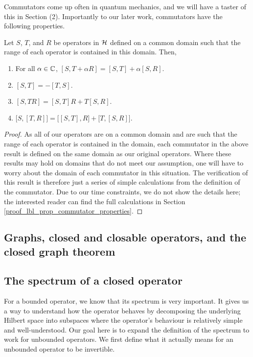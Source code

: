 Commutators come up often in quantum mechanics, and we will have a taster of this in Section (2). Importantly to our later work, commutators have the following properties.

\begin{proposition}\label{lbl_prop_commutator_properties}
  Let $S$, $T$, and $R$ be operators in $\mathcal{H}$ defined on a common domain such that the range of each operator is contained in this domain. Then,
  \begin{enumerate}[label = (\alph*)]
    \item For all $\alpha \in \mathbb{C}$, $[S, T + \alpha R] = [S, T] + \alpha [S, R]$.
    \item $[S, T] = - [T, S]$.
    \item $[S, TR] = [S, T]R + T[S, R]$.
    \item $\big[ S, [T, R] \big] = \big[ [S, T], R \big] + \big[T, [S, R] \big]$.
  \end{enumerate}
\end{proposition}
\begin{proof}
  As all of our operators are on a common domain and are such that the range of each operator is contained in the domain, each commutator in the above result is defined on the same domain as our original operators. Where these results may hold on domains that do not meet our assumption, one will have to worry about the domain of each commutator in this situation. The verification of this result is therefore just a series of simple calculations from the definition of the commutator. Due to our time constraints, we do not show the details here; the interested reader can find the full calculations in Section \eqref{proof_lbl_prop_commutator_properties}.
\end{proof}

\subsection{Graphs, closed and closable operators, and the closed graph theorem}



\subsection{The spectrum of a closed operator}

For a bounded operator, we know that its spectrum is very important. It gives us a way to understand how the operator behaves by decomposing the underlying Hilbert space into subspaces where the operator's behaviour is relatively simple and well-understood. Our goal here is to expand the definition of the spectrum to work for unbounded operators. We first define what it actually means for an unbounded operator to be invertible.

